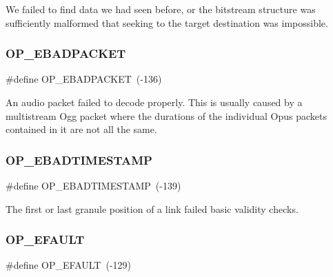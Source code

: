 We failed to find data we had seen before, or the bitstream structure was sufficiently malformed that seeking to the target destination was impossible. \mbox{\label{group__error__codes_gaa3fa0a3e6facc4f47924271e65bb21ff}} 
\subsubsection{\texorpdfstring{O\+P\+\_\+\+E\+B\+A\+D\+P\+A\+C\+K\+ET}{OP\_EBADPACKET}}
{\footnotesize\ttfamily \#define O\+P\+\_\+\+E\+B\+A\+D\+P\+A\+C\+K\+ET~(-\/136)}

An audio packet failed to decode properly. This is usually caused by a multistream Ogg packet where the durations of the individual Opus packets contained in it are not all the same. \mbox{\label{group__error__codes_gaf82657fc888f1dcf2e0d8f066b8a6cc7}} 
\subsubsection{\texorpdfstring{O\+P\+\_\+\+E\+B\+A\+D\+T\+I\+M\+E\+S\+T\+A\+MP}{OP\_EBADTIMESTAMP}}
{\footnotesize\ttfamily \#define O\+P\+\_\+\+E\+B\+A\+D\+T\+I\+M\+E\+S\+T\+A\+MP~(-\/139)}

The first or last granule position of a link failed basic validity checks. \mbox{\label{group__error__codes_ga2ddb887c0bb55c74ea6be391fabcba59}} 
\subsubsection{\texorpdfstring{O\+P\+\_\+\+E\+F\+A\+U\+LT}{OP\_EFAULT}}
{\footnotesize\ttfamily \#define O\+P\+\_\+\+E\+F\+A\+U\+LT~(-\/129)}

